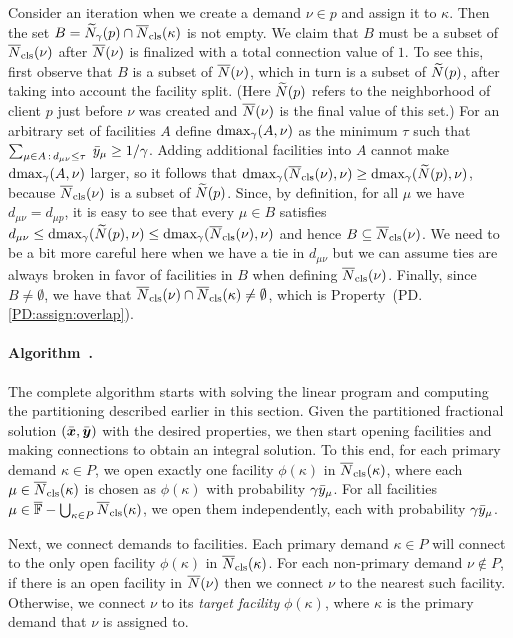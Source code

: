 Consider an iteration when we create a demand $\nu\in p$
and assign it to $\kappa$. Then the set
$B={\widetilde N}_{\gamma}(p)\cap {\overline{N}}_{\text{cls}}(\kappa)$ is not empty.
We claim that
$B$ must be a subset of ${\overline{N}}_{\text{cls}}(\nu)$ after ${\overline{N}}(\nu)$ is
finalized with a total connection value of $1$. To see this, first
observe that $B$ is a subset of ${\overline{N}}(\nu)$, which in turn is a
subset of ${\widetilde N}(p)$, after taking into account the facility
split. (Here ${\widetilde N}(p)$ refers to the neighborhood of client $p$
just before $\nu$ was created and ${\overline{N}}(\nu)$ is the final value of this set.) 
For an arbitrary set of facilities
$A$ define $\text{dmax}_\gamma(A, \nu)$ as the minimum $\tau$ such
that $\sum_{\mu\in A {\,:\,} d_{\mu\nu} \leq \tau}\;{\bar y}_{\mu} \geq
1/\gamma$.
Adding additional facilities into $A$ cannot make
$\text{dmax}_\gamma(A, \nu)$ larger, so it follows that 
$\text{dmax}_\gamma ({\overline{N}}_{\text{cls}}(\nu), \nu)
	\geq \text{dmax}_\gamma({\widetilde N}(p), \nu)$, because ${\overline{N}}_{\text{cls}}(\nu)$ is a subset of
${\widetilde N}(p)$. Since, by definition, for all $\mu$ we have $d_{\mu \nu} = d_{\mu p}$,
it is easy to see that every $\mu \in B$ satisfies 
$d_{\mu \nu} \leq \text{dmax}_\gamma({\widetilde N}(p), \nu) 
			\leq \text{dmax}_\gamma({\overline{N}}_{\text{cls}}(\nu), \nu)$ 
and hence  $B\subseteq {\overline{N}}_{\text{cls}}(\nu)$. We need to be a bit more
careful here when we have a tie in $d_{\mu\nu}$ but we can assume ties
are always broken in favor of facilities in $B$ when defining
${\overline{N}}_{\text{cls}}(\nu)$. Finally, since $B\neq\emptyset$, we 
have that ${\overline{N}}_{\text{cls}}(\nu)\cap {\overline{N}}_{\text{cls}}(\kappa)\neq\emptyset$,
which is Property~(PD.\ref{PD:assign:overlap}).


\paragraph{Algorithm~{\EBGS}.}
The complete algorithm starts with solving the linear program and
computing the partitioning described earlier in this section.
Given the partitioned fractional solution $(\bar{\boldsymbol{x}},
\bar{\boldsymbol{y}})$ with the desired properties, we then start opening
facilities and making connections to obtain an integral
solution. To this end, for each primary demand $\kappa\in P$,
we open exactly one facility $\phi(\kappa)$ in ${\overline{N}}_{\text{cls}}(\kappa)$,
where each $\mu\in{\overline{N}}_{\text{cls}}(\kappa)$ is chosen as $\phi(\kappa)$ with probability
$\gamma{\bar y}_{\mu}$. For all facilities
 $\mu\in\overline{\mathbb{F}} - \bigcup_{\kappa\in P}{\overline{N}}_{\text{cls}}(\kappa)$,
we open them independently, each with
probability $\gamma{\bar y}_{\mu}$. 

Next, we connect demands to facilities.
Each primary demand $\kappa\in P$ will connect
to the only open facility $\phi(\kappa)$ in ${\overline{N}}_{\text{cls}}(\kappa)$.  
For each non-primary demand $\nu\notin P$, if
there is an open facility in ${\overline{N}}(\nu)$ then we connect
$\nu$ to the nearest such facility. Otherwise, we connect
$\nu$ to its \emph{target facility} $\phi(\kappa)$, where $\kappa$ is the primary
demand that $\nu$ is assigned to. 

